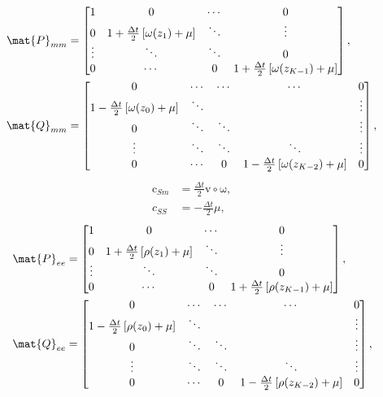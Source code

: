 \documentclass{jpmarticle}
\renewcommand{\vec}[1]{\boldsymbol{\mathrm{#1}}}
\begin{document}
\begin{equation}
  \begin{split}
    \mat{P}_{mm} &=
    \begin{bmatrix}
      1 & 0 & \cdots & 0
      \\
      0 & 1 + \frac{\Delta t}{2} \left[\omega(z_1) + \mu\right] &
      \ddots & \vdots
      \\
      \vdots & \ddots & \ddots & 0
      \\
      0 & \cdots & 0 &
      1 + \frac{\Delta t}{2} \left[\omega(z_{K - 1}) + \mu\right]
    \end{bmatrix},
    \\
    \mat{Q}_{mm} &=
    \begin{bmatrix}
      0 & \cdots & \cdots & \cdots & 0
      \\
      1 - \frac{\Delta t}{2} \left[\omega(z_0) + \mu\right] & \ddots &
      & & \vdots
      \\
      0 & \ddots & \ddots & & \vdots
      \\
      \vdots & \ddots & \ddots & \ddots & \vdots
      \\
      0 & \cdots & 0 &
      1 - \frac{\Delta t}{2} \left[\omega(z_{K - 2}) + \mu\right] & 0
    \end{bmatrix},
  \end{split}
\end{equation}
\begin{equation}
  \begin{split}
    \vec{c}_{Sm} &=
    \frac{\Delta t}{2} \vec{v} \circ \vec{\omega},
    \\
    c_{SS} &= - \frac{\Delta t}{2} \mu,
  \end{split}
\end{equation}
\begin{equation}
  \begin{split}
    \mat{P}_{ee} &=
    \begin{bmatrix}
      1 & 0 & \cdots & 0
      \\
      0 & 1 + \frac{\Delta t}{2} \left[\rho(z_1) + \mu\right] &
      \ddots & \vdots
      \\
      \vdots & \ddots & \ddots & 0
      \\
      0 & \cdots & 0 &
      1 + \frac{\Delta t}{2} \left[\rho(z_{K - 1}) + \mu\right]
    \end{bmatrix},
    \\
    \mat{Q}_{ee} &=
    \begin{bmatrix}
      0 & \cdots & \cdots & \cdots & 0
      \\
      1 - \frac{\Delta t}{2} \left[\rho(z_0) + \mu\right] & \ddots &
      & & \vdots
      \\
      0 & \ddots & \ddots & & \vdots
      \\
      \vdots & \ddots & \ddots & \ddots & \vdots
      \\
      0 & \cdots & 0 &
      1 - \frac{\Delta t}{2} \left[\rho(z_{K - 2}) + \mu\right] & 0
    \end{bmatrix},
  \end{split}
\end{equation}
\end{document}
